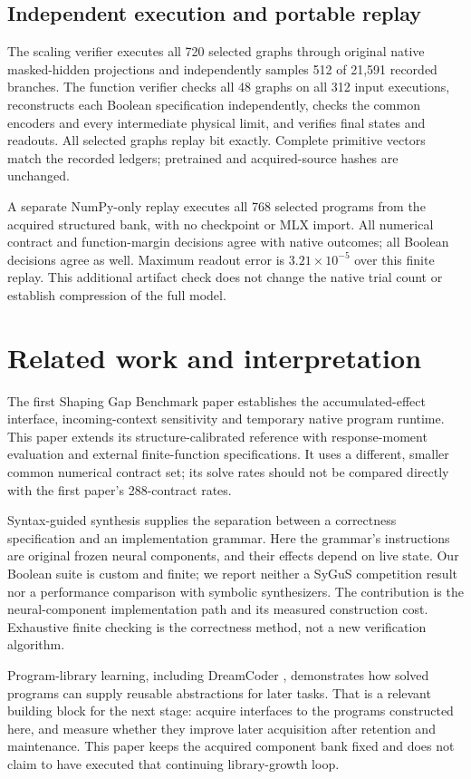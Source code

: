 \documentclass[11pt]{article}
\begin{document}
\subsection{Independent execution and portable replay}
The scaling verifier executes all 720 selected graphs through original native
masked-hidden projections and independently samples 512 of 21,591 recorded
branches. The function verifier checks all 48 graphs on all 312 input executions,
reconstructs each Boolean specification independently, checks the common encoders
and every intermediate physical limit, and verifies final states and readouts.
All selected graphs replay bit exactly. Complete primitive vectors match the
recorded ledgers; pretrained and acquired-source hashes are unchanged.

A separate NumPy-only replay executes all 768 selected programs from the
acquired structured bank, with no checkpoint or MLX import. All numerical
contract and function-margin decisions agree with native outcomes; all Boolean
decisions agree as well. Maximum readout error is $3.21\times10^{-5}$ over this
finite replay. This additional artifact check does not change the native trial
count or establish compression of the full model.

\section{Related work and interpretation}
The first Shaping Gap Benchmark paper \cite{sgb1} establishes the accumulated-effect
interface, incoming-context sensitivity and temporary native program runtime.
This paper extends its structure-calibrated reference with response-moment
evaluation and external finite-function specifications. It uses a different,
smaller common numerical contract set; its solve rates should not be compared
directly with the first paper's 288-contract rates.

Syntax-guided synthesis \cite{sygus,standard} supplies the separation between a
correctness specification and an implementation grammar. Here the grammar's
instructions are original frozen neural components, and their effects depend on
live state. Our Boolean suite is custom and finite; we report neither a SyGuS
competition result nor a performance comparison with symbolic synthesizers.
The contribution is the neural-component implementation path and its measured
construction cost. Exhaustive finite checking is the correctness method, not
a new verification algorithm.

Program-library learning, including DreamCoder \cite{dreamcoder}, demonstrates
how solved programs can supply reusable abstractions for later tasks. That is
a relevant building block for the next stage: acquire interfaces to the programs
constructed here, and measure whether they improve later acquisition after
retention and maintenance. This paper keeps the acquired component bank fixed
and does not claim to have executed that continuing library-growth loop.
\end{document}
